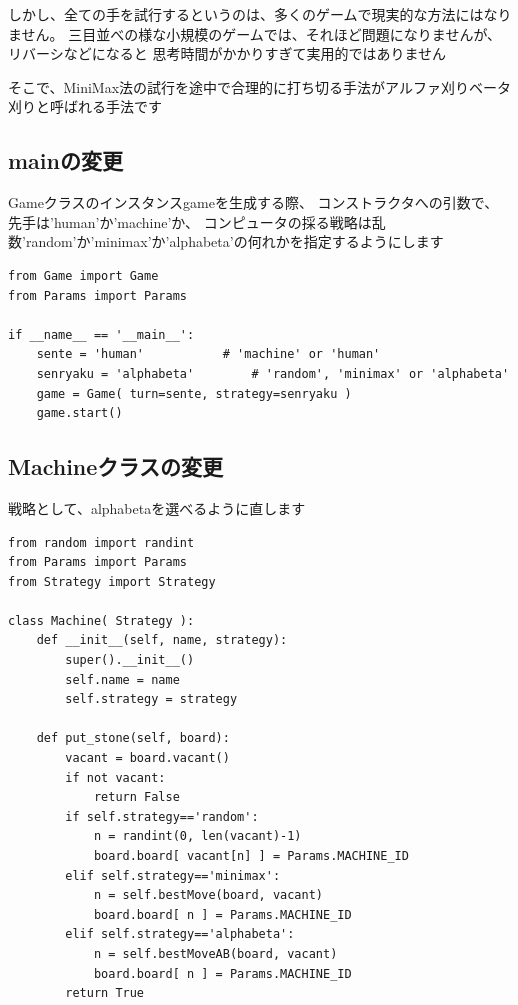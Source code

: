\documentclass[uplatex,a4paper,11pt,oneside,openany]{jsbook}
\begin{document}
しかし、全ての手を試行するというのは、多くのゲームで現実的な方法にはなりません。
三目並べの様な小規模のゲームでは、それほど問題になりませんが、リバーシなどになると
思考時間がかかりすぎて実用的ではありません

そこで、MiniMax法の試行を途中で合理的に打ち切る手法がアルファ刈りベータ刈りと呼ばれる手法です

\subsection{mainの変更}

Gameクラスのインスタンスgameを生成する際、
コンストラクタへの引数で、先手は'human'か'machine'か、
コンピュータの採る戦略は乱数'random'か'minimax'か'alphabeta'の何れかを指定するようにします

\begin{lstlisting}[caption=main.py,label=minimax00]
from Game import Game
from Params import Params

if __name__ == '__main__':
    sente = 'human'           # 'machine' or 'human'
    senryaku = 'alphabeta'        # 'random', 'minimax' or 'alphabeta'
    game = Game( turn=sente, strategy=senryaku )
    game.start()
\end{lstlisting}

\subsection{Machineクラスの変更}

戦略として、alphabetaを選べるように直します

\begin{lstlisting}[caption=class Machine,label=minimax00]
from random import randint
from Params import Params
from Strategy import Strategy

class Machine( Strategy ):
    def __init__(self, name, strategy):
        super().__init__()
        self.name = name
        self.strategy = strategy

    def put_stone(self, board):
        vacant = board.vacant()
        if not vacant:
            return False
        if self.strategy=='random':
            n = randint(0, len(vacant)-1)
            board.board[ vacant[n] ] = Params.MACHINE_ID
        elif self.strategy=='minimax':
            n = self.bestMove(board, vacant)
            board.board[ n ] = Params.MACHINE_ID
        elif self.strategy=='alphabeta':
            n = self.bestMoveAB(board, vacant)
            board.board[ n ] = Params.MACHINE_ID
        return True
\end{lstlisting}
\end{document}
